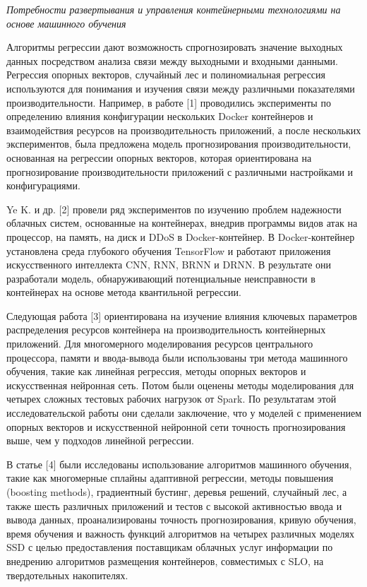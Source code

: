 \emph{Потребности развертывания и управления контейнерными технологиями
на основе машинного обучения}

Алгоритмы регрессии дают возможность спрогнозировать значение выходных
данных посредством анализа связи между выходными и входными данными.
Регрессия опорных векторов, случайный лес и полиномиальная регрессия
используются для понимания и изучения связи между различными
показателями производительности. Например, в работе {[}1{]} проводились
эксперименты по определению влияния конфигурации нескольких Docker
контейнеров и взаимодействия ресурсов на производительность приложений,
а после нескольких экспериментов, была предложена модель прогнозирования
производительности, основанная на регрессии опорных векторов, которая
ориентирована на прогнозирование производительности приложений с
различными настройками и конфигурациями.

Ye K. и др. {[}2{]} провели ряд экспериментов по изучению проблем
надежности облачных систем, основанные на контейнерах, внедрив программы
видов атак на процессор, на память, на диск и DDoS в Docker-контейнер. В
Docker-контейнер установлена среда глубокого обучения TensorFlow и
работают приложения искусственного интеллекта CNN, RNN, BRNN и DRNN. В
результате они разработали модель, обнаруживающий потенциальные
неисправности в контейнерах на основе метода квантильной регрессии.

Следующая работа {[}3{]} ориентирована на изучение влияния ключевых
параметров распределения ресурсов контейнера на производительность
контейнерных приложений. Для многомерного моделирования ресурсов
центрального процессора, памяти и ввода-вывода были использованы три
метода машинного обучения, такие как линейная регрессия, методы опорных
векторов и искусственная нейронная сеть. Потом были оценены методы
моделирования для четырех сложных тестовых рабочих нагрузок от Spark. По
результатам этой исследовательской работы они сделали заключение, что у
моделей с применением опорных векторов и искусственной нейронной сети
точность прогнозирования выше, чем у подходов линейной регрессии.

В статье {[}4{]} были исследованы использование алгоритмов машинного
обучения, такие как многомерные сплайны адаптивной регрессии, методы
повышения (boosting methods), градиентный бустинг, деревья решений,
случайный лес, а также шесть различных приложений и тестов с высокой
активностью ввода и вывода данных, проанализированы точность
прогнозирования, кривую обучения, время обучения и важность функций
алгоритмов на четырех различных моделях SSD с целью предоставления
поставщикам облачных услуг информации по внедрению алгоритмов размещения
контейнеров, совместимых с SLO, на твердотельных накопителях.

